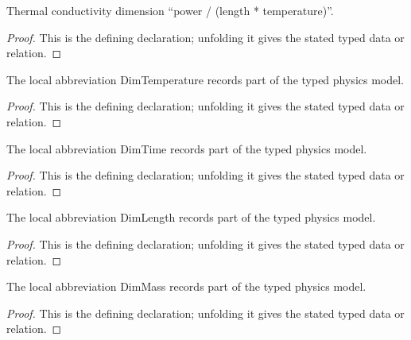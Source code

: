 \begin{definition}[thermalConductivityDimension]
  \label{decl:physics:IPhO_2026_4_C_6:thermalConductivityDimension}
  Thermal conductivity dimension “power / (length * temperature)”.
\end{definition}
\begin{proof}
  This is the defining declaration; unfolding it gives the stated typed data or relation.
\end{proof}

\begin{definition}[DimTemperature]
  \label{decl:physics:IPhO_2026_4_C_6:DimTemperature}
  The local abbreviation DimTemperature records part of the typed physics model.
\end{definition}
\begin{proof}
  This is the defining declaration; unfolding it gives the stated typed data or relation.
\end{proof}

\begin{definition}[DimTime]
  \label{decl:physics:IPhO_2026_4_C_6:DimTime}
  The local abbreviation DimTime records part of the typed physics model.
\end{definition}
\begin{proof}
  This is the defining declaration; unfolding it gives the stated typed data or relation.
\end{proof}

\begin{definition}[DimLength]
  \label{decl:physics:IPhO_2026_4_C_6:DimLength}
  The local abbreviation DimLength records part of the typed physics model.
\end{definition}
\begin{proof}
  This is the defining declaration; unfolding it gives the stated typed data or relation.
\end{proof}

\begin{definition}[DimMass]
  \label{decl:physics:IPhO_2026_4_C_6:DimMass}
  The local abbreviation DimMass records part of the typed physics model.
\end{definition}
\begin{proof}
  This is the defining declaration; unfolding it gives the stated typed data or relation.
\end{proof}

